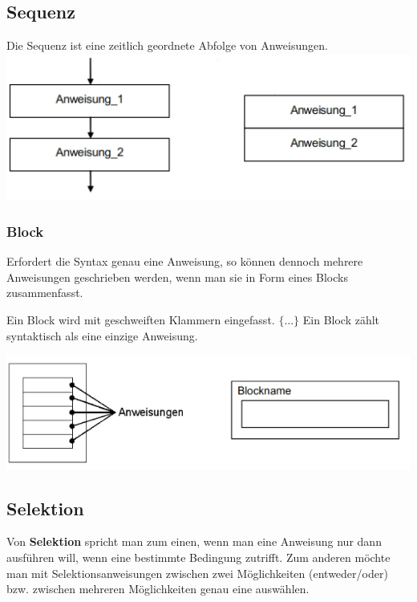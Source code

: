 \begin{minipage}[t]{9 cm}
		\subsection{Sequenz }
			Die Sequenz ist eine zeitlich geordnete Abfolge von Anweisungen. \\
				\includegraphics[width=1\textwidth]{pics/Sequenz.jpg}	
			
	\end{minipage}
	\begin{minipage}[t]{9 cm}
			\subsubsection{Block}
				\begin{compactitem}
					\item Erfordert die Syntax genau eine Anweisung, so können dennoch mehrere Anweisungen geschrieben werden, wenn man sie in Form eines Blocks zusammenfasst.
					\item Ein Block wird mit geschweiften Klammern eingefasst. $\{ \dots \}$ Ein Block zählt syntaktisch als eine einzige Anweisung.
				\end{compactitem}
				\includegraphics[width=1\textwidth]{pics/Block.jpg}
	\end{minipage}	
		
	\subsection{Selektion }
		Von \textbf{Selektion} spricht man zum einen, wenn man eine Anweisung nur dann ausführen will, wenn eine bestimmte Bedingung zutrifft. Zum anderen möchte man mit Selektionsanweisungen zwischen zwei Möglichkeiten (entweder/oder) bzw. zwischen mehreren Möglichkeiten genau eine auswählen.
		
